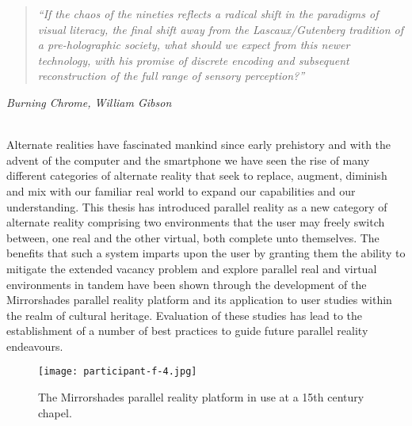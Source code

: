 


\begin{quote}
	\textit{``If the chaos of the nineties reflects a radical shift in the paradigms of visual literacy, the final shift away from the Lascaux/Gutenberg tradition of a pre-holographic society, what should we expect from this newer technology, with his promise of discrete encoding and subsequent reconstruction of the full range of sensory perception?''}
\end{quote}
\hfill \textit{Burning Chrome, William Gibson}
\\
\\


\label{chapter-conclusions}

Alternate realities have fascinated mankind since early prehistory and with the advent of the computer and the smartphone we have seen the rise of many different categories of alternate reality that seek to replace, augment, diminish and mix with our familiar real world to expand our capabilities and our understanding. This thesis has introduced parallel reality as a new category of alternate reality comprising two environments that the user may freely switch between, one real and the other virtual, both complete unto themselves. The benefits that such a system imparts upon the user by granting them the ability to mitigate the extended vacancy problem and explore parallel real and virtual environments in tandem have been shown through the development of the Mirrorshades parallel reality platform and its application to user studies within the realm of cultural heritage. Evaluation of these studies has lead to the establishment of a number of best practices to guide future parallel reality endeavours.

\begin{figure}[t]
	\begin{center}
		\texttt{[image: participant-f-4.jpg]}
		\caption{The Mirrorshades parallel reality platform in use at a 15th century chapel.}
		\label{participant-f-4.jpg}
	\end{center}	
\end{figure}

